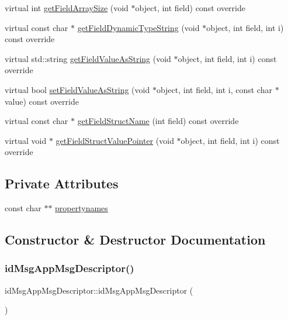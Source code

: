 \begin{DoxyCompactItemize}
\item 
virtual int \hyperlink{classid_msg_app_msg_descriptor_a55b2f838a298f91b5a0ca06fab71bcad}{get\+Field\+Array\+Size} (void $\ast$object, int field) const override
\item 
virtual const char $\ast$ \hyperlink{classid_msg_app_msg_descriptor_a166e1858ebf5b4c0115b540601799992}{get\+Field\+Dynamic\+Type\+String} (void $\ast$object, int field, int i) const override
\item 
virtual std\+::string \hyperlink{classid_msg_app_msg_descriptor_a42e71d687276c6b4ffd5d812eb9216a3}{get\+Field\+Value\+As\+String} (void $\ast$object, int field, int i) const override
\item 
virtual bool \hyperlink{classid_msg_app_msg_descriptor_a6293893d265e9968a97f9226dac829e9}{set\+Field\+Value\+As\+String} (void $\ast$object, int field, int i, const char $\ast$value) const override
\item 
virtual const char $\ast$ \hyperlink{classid_msg_app_msg_descriptor_ab4329d8695157a2583bf560578eca364}{get\+Field\+Struct\+Name} (int field) const override
\item 
virtual void $\ast$ \hyperlink{classid_msg_app_msg_descriptor_a8453c0ef000997f88024f1be37f1e5be}{get\+Field\+Struct\+Value\+Pointer} (void $\ast$object, int field, int i) const override
\end{DoxyCompactItemize}
\subsection*{Private Attributes}
\begin{DoxyCompactItemize}
\item 
const char $\ast$$\ast$ \hyperlink{classid_msg_app_msg_descriptor_a0415274a6b02ab2bd2a2c3226a9b4543}{propertynames}
\end{DoxyCompactItemize}


\subsection{Constructor \& Destructor Documentation}
\mbox{\label{classid_msg_app_msg_descriptor_a1f471f84ba71baffc0c0bedf29ff5522}} 
\subsubsection{\texorpdfstring{id\+Msg\+App\+Msg\+Descriptor()}{idMsgAppMsgDescriptor()}}
{\footnotesize\ttfamily id\+Msg\+App\+Msg\+Descriptor\+::id\+Msg\+App\+Msg\+Descriptor (\begin{DoxyParamCaption}{ }\end{DoxyParamCaption})}

